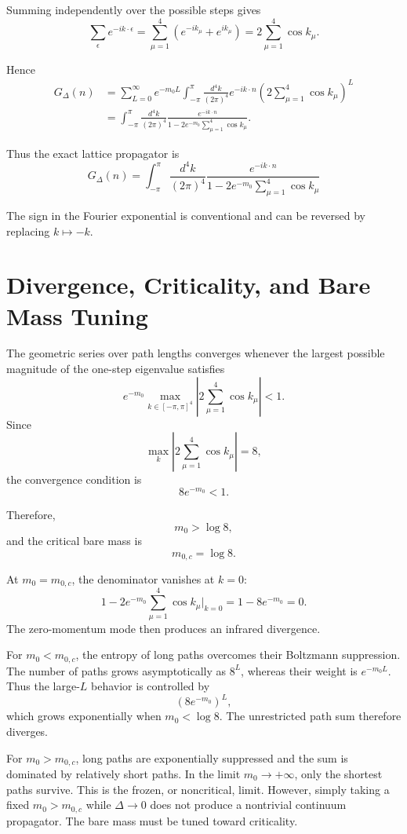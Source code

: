 \documentclass[11pt]{article}
\begin{document}
	Summing independently over the possible steps gives
	\[
	\sum_{\epsilon}
	e^{-ik\cdot\epsilon}
	=
	\sum_{\mu=1}^{4}
	\left(e^{-ik_\mu}+e^{ik_\mu}\right)
	=
	2\sum_{\mu=1}^{4}\cos k_\mu .
	\]
	
	Hence
	\begin{align}
		G_\Delta(n)
		&=
		\sum_{L=0}^{\infty}e^{-m_0L}
		\int_{-\pi}^{\pi}\frac{d^4k}{(2\pi)^4}
		e^{-ik\cdot n}
		\left(
		2\sum_{\mu=1}^{4}\cos k_\mu
		\right)^L
		\nonumber\\
		&=
		\int_{-\pi}^{\pi}\frac{d^4k}{(2\pi)^4}
		\frac{e^{-ik\cdot n}}
		{1-2e^{-m_0}\sum_{\mu=1}^{4}\cos k_\mu}.
	\end{align}
	
	Thus the exact lattice propagator is
	\[
	\boxed{
		G_\Delta(n)
		=
		\int_{-\pi}^{\pi}\frac{d^4k}{(2\pi)^4}
		\frac{e^{-ik\cdot n}}
		{1-2e^{-m_0}\displaystyle\sum_{\mu=1}^{4}\cos k_\mu}
	}
	\]
	
	The sign in the Fourier exponential is conventional and can be
	reversed by replacing $k\mapsto-k$.
	

	
	\section{Divergence, Criticality, and Bare Mass Tuning}
	
	The geometric series over path lengths converges whenever the largest
	possible magnitude of the one-step eigenvalue satisfies
	\[
	e^{-m_0}
	\max_{k\in[-\pi,\pi]^4}
	\left|
	2\sum_{\mu=1}^{4}\cos k_\mu
	\right|
	<1.
	\]
	Since
	\[
	\max_k\left|2\sum_{\mu=1}^{4}\cos k_\mu\right|=8,
	\]
	the convergence condition is
	\[
	8e^{-m_0}<1.
	\]
	
	Therefore,
	\[
	m_0>\log 8,
	\]
	and the critical bare mass is
	\[
	m_{0,c}=\log 8.
	\]
	
	At $m_0=m_{0,c}$, the denominator vanishes at $k=0$:
	\[
	1-2e^{-m_0}\sum_{\mu=1}^{4}\cos k_\mu
	\bigg|_{k=0}
	=
	1-8e^{-m_0}=0.
	\]
	The zero-momentum mode then produces an infrared divergence.
	
	For $m_0<m_{0,c}$, the entropy of long paths overcomes their
	Boltzmann suppression. The number of paths grows asymptotically as
	$8^L$, whereas their weight is $e^{-m_0L}$. Thus the large-$L$
	behavior is controlled by
	\[
	(8e^{-m_0})^L,
	\]
	which grows exponentially when $m_0<\log8$. The unrestricted path sum
	therefore diverges.
	
	For $m_0>m_{0,c}$, long paths are exponentially suppressed and the
	sum is dominated by relatively short paths. In the limit
	$m_0\to+\infty$, only the shortest paths survive. This is the frozen,
	or noncritical, limit. However, simply taking a fixed
	$m_0>m_{0,c}$ while $\Delta\to0$ does not produce a nontrivial
	continuum propagator. The bare mass must be tuned toward criticality.
	
\end{document}

